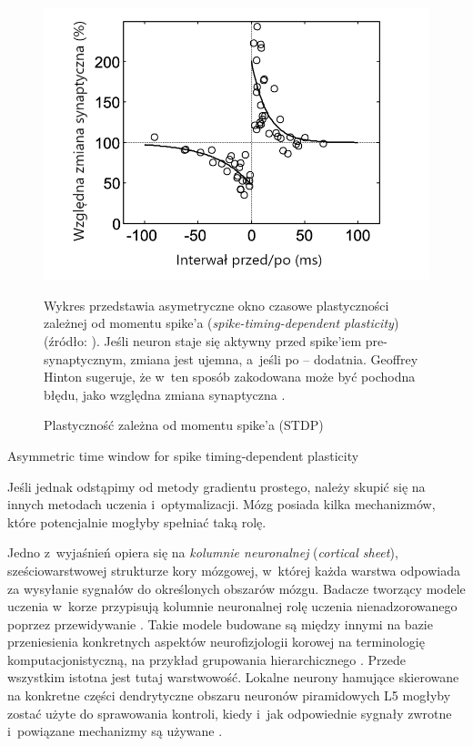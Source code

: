 \begin{figure}[!ht]
	\includegraphics[width=\textwidth]{Images/SpikeTimingDependentPlasticity}
	\caption{Plastyczność zależna od momentu spike'a (STDP)}
	Wykres przedstawia asymetryczne okno czasowe plastyczności zależnej od momentu spike'a (\emph{spike-timing-dependent plasticity}) (źródło: \cite{yao2005synaptic}).
	Jeśli neuron staje się aktywny przed spike'iem pre-synaptycznym, zmiana jest ujemna, a~jeśli po -- dodatnia.
	Geoffrey Hinton sugeruje, że w~ten sposób zakodowana może być pochodna błędu, jako względna zmiana synaptyczna \cite{hinton2016can}.
	\label{fig:spike-timing-dependent-plasticity}
\end{figure}

Asymmetric time window for spike timing-dependent plasticity

Jeśli jednak odstąpimy od metody gradientu prostego, należy skupić się na innych metodach uczenia i~optymalizacji.
Mózg posiada kilka mechanizmów, które potencjalnie mogłyby spełniać taką rolę.

Jedno z~wyjaśnień opiera się na \emph{kolumnie neuronalnej} (\emph{cortical sheet}), sześciowarstwowej strukturze kory mózgowej, w~której każda warstwa odpowiada za wysyłanie sygnałów do określonych obszarów mózgu.
Badacze tworzący modele uczenia w~korze przypisują kolumnie neuronalnej rolę uczenia nienadzorowanego poprzez przewidywanie \cite{o2014learning}.
Takie modele budowane są między innymi na bazie przeniesienia konkretnych aspektów neurofizjologii korowej na terminologię komputacjonistyczną, na przykład grupowania hierarchicznego \cite{rodriguez2004derivation}.
Przede wszystkim istotna jest tutaj warstwowość.
Lokalne neurony hamujące skierowane na konkretne części dendrytyczne obszaru neuronów piramidowych L5 mogłyby zostać użyte do sprawowania kontroli, kiedy i~jak odpowiednie sygnały zwrotne i~powiązane mechanizmy są używane \cite{marblestone2016toward}.

